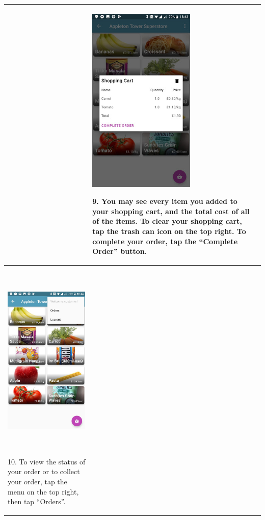 \documentclass[onecolumn]{IEEEtran}
\begin{document}
\begin{table}[H]
\begin{tabular}{ | m{5.5cm} | m{5.5cm} | m{5.5cm} | }
    & 
    \begin{minipage}{.31\textwidth}
      \includegraphics[width=\linewidth, height=90mm]{nine.jpg}
    \end{minipage}
    9. You may see every item you added to your shopping cart, and the total cost of all of the items. To clear your shopping cart, tap the trash can icon on the top right. To complete your order, tap the “Complete Order” button.
    \\ \hline
    \begin{minipage}{.31\textwidth}
      \includegraphics[width=\linewidth, height=90mm]{ten.jpg}
    \end{minipage}
    10. To view the status of your order or to collect your order, tap the menu on the top right, then tap “Orders”.
    &
    \begin{minipage}{.31\textwidth}

\end{minipage}
\end{tabular}
\end{table}
\end{document}
